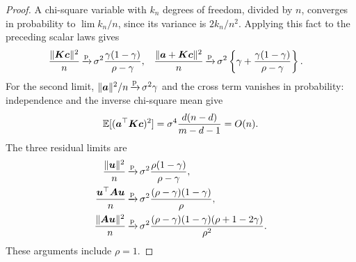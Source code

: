 \documentclass{article}
\theoremstyle{plain} %
\theoremstyle{definition} %
\theoremstyle{definition} %
\begin{document}
\begin{proof}
A chi-square variable with $k_n$ degrees of freedom, divided by $n$,
converges in probability to $\lim k_n/n$, since its variance is $2k_n/n^2$.
Applying this fact to the preceding scalar laws gives
\begin{align}
    \frac{\lVert\boldsymbol{K}\boldsymbol{c}\rVert^2}{n}
       &{\,\smash{\xrightarrow{\mathrm{p}}}}\,\sigma^2\frac{\gamma(1-\gamma)}{\rho-\gamma},
    &
    \frac{\lVert\boldsymbol{a}+\boldsymbol{K}\boldsymbol{c}\rVert^2}{n}
       &{\,\smash{\xrightarrow{\mathrm{p}}}}\,\sigma^2\left\{\gamma+
              \frac{\gamma(1-\gamma)}{\rho-\gamma}\right\}.
    \label{eq:Gaussian-K-traces}
\end{align}
For the second limit, $\lVert\boldsymbol{a}\rVert^2/n{\,\smash{\xrightarrow{\mathrm{p}}}}\,\sigma^2\gamma$ and the
cross term vanishes in probability: independence and the inverse
chi-square mean give
\begin{align*}
    {\mathbb{E}}[(\boldsymbol{a}^\top\boldsymbol{K}\boldsymbol{c})^2]
       =\sigma^4\frac{d(n-d)}{m-d-1}=O(n).
\end{align*}
The three residual limits are
\begin{align}
    \frac{\lVert\boldsymbol{u}\rVert^2}{n}
    &{\,\smash{\xrightarrow{\mathrm{p}}}}\, \sigma^2\frac{\rho(1-\gamma)}{\rho-\gamma},
    \label{eq:Gaussian-u-limit}\\
    \frac{\boldsymbol{u}^\top\boldsymbol{A}\boldsymbol{u}}{n}
    &{\,\smash{\xrightarrow{\mathrm{p}}}}\, \sigma^2\frac{(\rho-\gamma)(1-\gamma)}{\rho},\notag\\
    \frac{\lVert\boldsymbol{A}\boldsymbol{u}\rVert^2}{n}
    &{\,\smash{\xrightarrow{\mathrm{p}}}}\, \sigma^2\frac{(\rho-\gamma)(1-\gamma)(\rho+1-2\gamma)}{\rho^2}.
    \notag
\end{align}
These arguments include $\rho=1$.


\end{proof}
\end{document}
